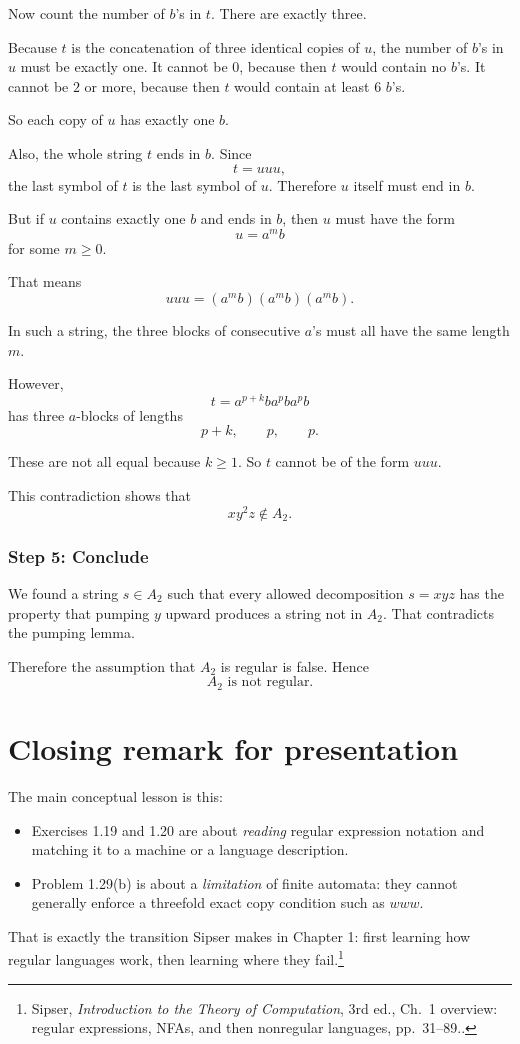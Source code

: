 \documentclass[12pt]{article}
\newcommand{\sipser}[1]{\footnote{Sipser, \emph{Introduction to the Theory of Computation}, 3rd ed., #1.}}
\begin{document}
Now count the number of \(b\)'s in \(t\). There are exactly three.

Because \(t\) is the concatenation of three identical copies of \(u\), the number of \(b\)'s in \(u\) must be exactly one. It cannot be \(0\), because then \(t\) would contain no \(b\)'s. It cannot be \(2\) or more, because then \(t\) would contain at least \(6\) \(b\)'s.

So each copy of \(u\) has exactly one \(b\).

Also, the whole string \(t\) ends in \(b\). Since
\[
t=uuu,
\]
the last symbol of \(t\) is the last symbol of \(u\). Therefore \(u\) itself must end in \(b\).

But if \(u\) contains exactly one \(b\) and ends in \(b\), then \(u\) must have the form
\[
u=a^m b
\]
for some \(m\ge 0\).

That means
\[
uuu=(a^mb)(a^mb)(a^mb).
\]

In such a string, the three blocks of consecutive \(a\)'s must all have the same length \(m\).

However,
\[
t=a^{p+k}ba^pba^pb
\]
has three \(a\)-blocks of lengths
\[
p+k,\qquad p,\qquad p.
\]

These are not all equal because \(k\ge 1\). So \(t\) cannot be of the form \(uuu\).

This contradiction shows that
\[
xy^2z\notin A_2.
\]

\subsubsection*{Step 5: Conclude}

We found a string \(s\in A_2\) such that every allowed decomposition \(s=xyz\) has the property that pumping \(y\) upward produces a string not in \(A_2\). That contradicts the pumping lemma.

Therefore the assumption that \(A_2\) is regular is false. Hence
\[
\boxed{A_2 \text{ is not regular.}}
\]

\section*{Closing remark for presentation}

The main conceptual lesson is this:

\begin{itemize}[itemsep=0.4em]
    \item Exercises 1.19 and 1.20 are about \emph{reading} regular expression notation and matching it to a machine or a language description.
    \item Problem 1.29(b) is about a \emph{limitation} of finite automata: they cannot generally enforce a threefold exact copy condition such as \(www\).
\end{itemize}

That is exactly the transition Sipser makes in Chapter 1: first learning how regular languages work, then learning where they fail.\sipser{Ch.~1 overview: regular expressions, NFAs, and then nonregular languages, pp.~31--89.}
\end{document}

